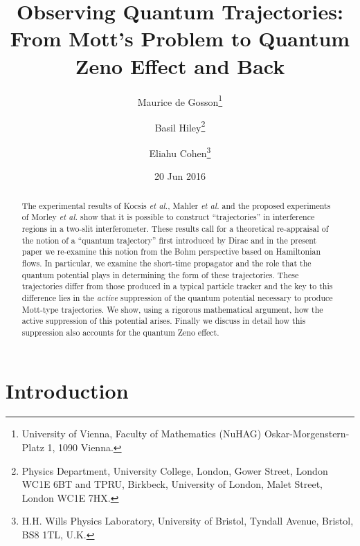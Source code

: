 \documentclass[12pt]{article}%
\date{20 Jun 2016}
\begin{document}
\title{Observing Quantum Trajectories: From Mott's Problem to Quantum Zeno Effect and Back}
\author{Maurice de Gosson\thanks{University of Vienna, Faculty of Mathematics (NuHAG)
Oskar-Morgenstern-Platz 1, 1090 Vienna.}
\and Basil Hiley\thanks{Physics Department, University College, London, Gower
Street, London WC1E 6BT and TPRU, Birkbeck, University of London, Malet
Street, London WC1E 7HX.}
\and Eliahu Cohen\thanks{H.H. Wills Physics Laboratory, University of Bristol,
Tyndall Avenue, Bristol, BS8 1TL, U.K.}}
\maketitle

\begin{abstract}
The experimental results of Kocsis \emph{et al.}, Mahler \emph{et al.} and the
proposed experiments of Morley \emph{et al.} show that it is possible to
construct ``trajectories'' in interference regions in a two-slit
interferometer. These results call for a
theoretical re-appraisal of the notion of a ``quantum trajectory'' first
introduced by Dirac and in
the present paper we re-examine this notion from the Bohm perspective based on
Hamiltonian flows. In particular, we examine the short-time propagator and the
role that the quantum potential plays in determining the form of these
trajectories. These trajectories differ from those produced in a typical
particle tracker and the key to this difference lies in the \emph{active}
suppression of the quantum potential necessary to produce Mott-type
trajectories. We show, using a rigorous mathematical argument, how the active
suppression of this potential arises. Finally we discuss in detail how this
suppression also accounts for the quantum Zeno effect.

\end{abstract}

\newpage

\section{Introduction}
\end{document}
